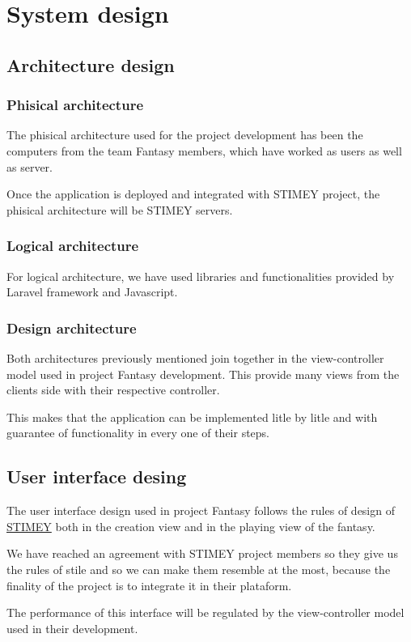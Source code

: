 \chapter{System design}
\section{Architecture design}
\subsection{Phisical architecture}
The phisical architecture used for the project development has been the computers from the team Fantasy members, which have worked as users as well as server.

Once the application is deployed and integrated with STIMEY project, the phisical architecture will be STIMEY servers.

\subsection{Logical architecture}
For logical architecture, we have used libraries and functionalities provided by Laravel framework and Javascript.

\subsection{Design architecture}
Both architectures previously mentioned join together in the view-controller model used in project Fantasy development. This provide many views from the clients side with their respective controller.

This makes that the application can be implemented litle by litle and with guarantee of functionality in every one of their steps.

\section{User interface desing}
The user interface design used in project Fantasy follows the rules of design of \href{https://stimey.eu/home}{STIMEY} both in the creation view and in the playing view of the fantasy.

We have reached an agreement with STIMEY project members so they give us the rules of stile and so we can make them resemble at the most, because the finality of the project is to integrate it in their plataform.

The performance of this interface will be regulated by the view-controller model used in their development.

